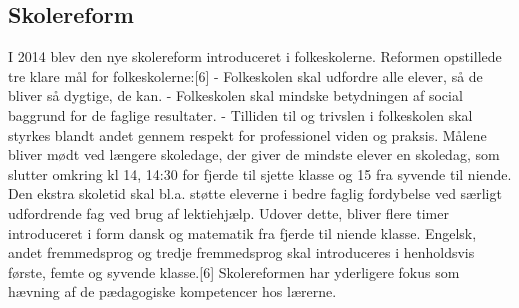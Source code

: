 \subsection{Skolereform}
I 2014 blev den nye skolereform introduceret i folkeskolerne. Reformen opstillede tre klare mål for folkeskolerne:[6]
-	Folkeskolen skal udfordre alle elever, så de bliver så dygtige, de kan.
-	Folkeskolen skal mindske betydningen af social baggrund for de faglige resultater.
-	Tilliden til og trivslen i folkeskolen skal styrkes blandt andet gennem respekt for professionel viden og praksis.
Målene bliver mødt ved længere skoledage, der giver de mindste elever en skoledag, som slutter omkring kl 14, 14:30 for fjerde til sjette klasse og 15 fra syvende til niende. Den ekstra skoletid skal bl.a. støtte eleverne i bedre faglig fordybelse ved særligt udfordrende fag ved brug af lektiehjælp. Udover dette, bliver flere timer introduceret i form dansk og matematik fra fjerde til niende klasse. Engelsk, andet fremmedsprog og tredje fremmedsprog skal introduceres i henholdsvis første, femte og syvende klasse.[6]
Skolereformen har yderligere fokus som hævning af de pædagogiske kompetencer hos lærerne.
